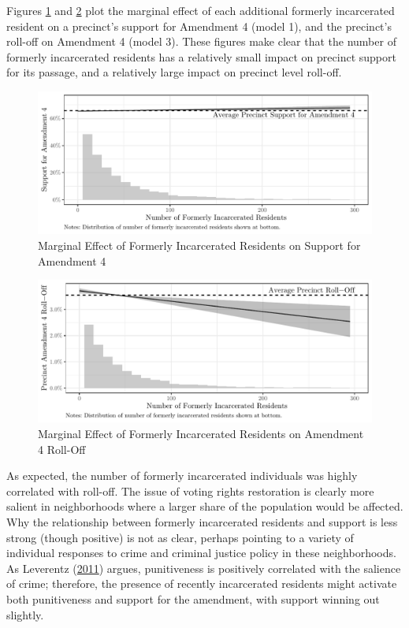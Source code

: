 \documentclass[
  12pt,
]{article}
\begin{document}
Figures \ref{fig:marg-alt} and \ref{fig:marg-alt2} plot the marginal effect of each additional formerly incarcerated resident on a precinct's support for Amendment 4 (model 1), and the precinct's roll-off on Amendment 4 (model 3). These figures make clear that the number of formerly incarcerated residents has a relatively small impact on precinct support for its passage, and a relatively large impact on precinct level roll-off.

\begin{figure}[H]

{\centering \includegraphics{amendment_4_turnout_files/figure-latex/marg-alt-1} 

}

\caption{\label{fig:marg-alt}Marginal Effect of Formerly Incarcerated Residents on Support for Amendment 4}\label{fig:marg-alt}
\end{figure}
\begin{figure}[H]

{\centering \includegraphics{amendment_4_turnout_files/figure-latex/marg-alt2-1} 

}

\caption{\label{fig:marg-alt2}Marginal Effect of Formerly Incarcerated Residents on Amendment 4 Roll-Off}\label{fig:marg-alt2}
\end{figure}

As expected, the number of formerly incarcerated individuals was highly correlated with roll-off. The issue of voting rights restoration is clearly more salient in neighborhoods where a larger share of the population would be affected. Why the relationship between formerly incarcerated residents and support is less strong (though positive) is not as clear, perhaps pointing to a variety of individual responses to crime and criminal justice policy in these neighborhoods. As Leverentz (\protect\hyperlink{ref-Leverentz2011}{2011}) argues, punitiveness is positively correlated with the salience of crime; therefore, the presence of recently incarcerated residents might activate both punitiveness and support for the amendment, with support winning out slightly.
\end{document}
